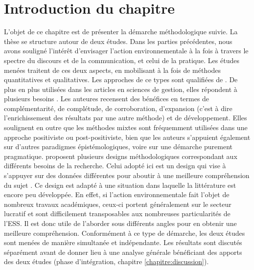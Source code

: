 \section*{Introduction du chapitre}

	L'objet de ce chapitre est de présenter la démarche méthodologique suivie. La thèse se structure autour de deux études. Dans les parties précédentes, nous avons souligné l'intérêt d'envisager l'action environnementale à la fois à travers le spectre du discours et de la communication, et celui de la pratique. Les études menées traitent de ces deux aspects, en mobilisant à la fois de méthodes quantitatives et qualitatives. Les approches de ce types sont qualifiées de  \parencite{aldebert2011utilisation}. De plus en plus utilisées dans les articles en sciences de gestion, elles répondent à plusieurs besoins \parencite{pascal2018les}. Les auteures recensent des bénéfices en termes de complémentarité, de complétude, de corroboration, d'expansion (c'est à dire l'enrichissement des résultats par une autre méthode) et de développement. Elles soulignent en outre que les méthodes mixtes sont fréquemment utilisées dans une approche positiviste ou post-positiviste, bien que les auteurs s'appuient également sur d'autres paradigmes épistémologiques, voire sur une démarche purement pragmatique. \textcite{klassen2012best, creswell2010designing} proposent plusieurs designs méthodologiques correspondant aux différents besoins de la recherche. Celui adopté ici est un design  qui vise à s'appuyer sur des données différentes pour aboutir à une meilleure compréhension du sujet \parencite{pascal2018les}. Ce design est adapté à une situation dans laquelle la littérature est encore peu développée. En effet, si l’action environnementale fait l’objet de nombreux travaux académiques, ceux-ci portent généralement sur le secteur lucratif et sont difficilement transposables aux nombreuses particularités de l’ESS. Il est donc utile de l'aborder sous différents angles pour en obtenir une meilleure compréhension. Conformément à ce type de démarche, les deux études sont menées de manière simultanée et indépendante. Les résultats sont discutés séparément avant de donner lieu à une analyse générale bénéficiant des apports des deux études (phase d'intégration, chapitre \ref{chapitre:discussion}).	\\


